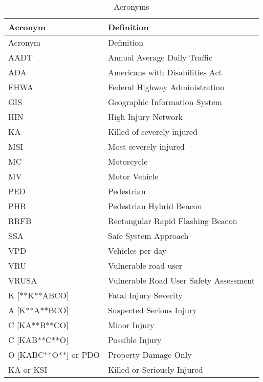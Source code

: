 \documentclass[
  letterpaper,
]{scrbook}
\begin{document}
\hypertarget{tbl-acronyms}{}
\begin{longtable}[]{@{}ll@{}}
\caption{\label{tbl-acronyms}Acronyms}\tabularnewline
\toprule()
Acronym & Definition \\
\midrule()
\endfirsthead
\toprule()
Acronym & Definition \\
\midrule()
\endhead
AADT & Annual Average Daily Traffic \\
ADA & Americans with Disabilities Act \\
FHWA & Federal Highway Administration \\
GIS & Geographic Information System \\
HIN & High Injury Network \\
KA & Killed of severely injured \\
MSI & Most severely injured \\
MC & Motorcycle \\
MV & Motor Vehicle \\
PED & Pedestrian \\
PHB & Pedestrian Hybrid Beacon \\
RRFB & Rectangular Rapid Flashing Beacon \\
SSA & Safe System Approach \\
VPD & Vehicles per day \\
VRU & Vulnerable road user \\
VRUSA & Vulnerable Road User Safety Assessment \\
K {[}**K**ABCO{]} & Fatal Injury Severity \\
A {[}K**A**BCO{]} & Suspected Serious Injury \\
C {[}KA**B**CO{]} & Minor Injury \\
C {[}KAB**C**O{]} & Possible Injury \\
O {[}KABC**O**{]} or PDO & Property Damage Only \\
KA or KSI & Killed or Seriously Injured \\
\bottomrule()
\end{longtable}


\backmatter
\end{document}
